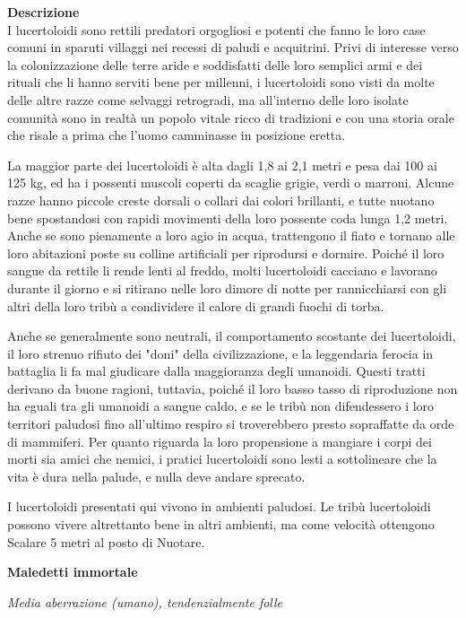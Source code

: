 \begin{multicols}{2}
	\textbf{Descrizione}\\
	I lucertoloidi sono rettili predatori orgogliosi e potenti che fanno le loro case comuni in sparuti villaggi nei recessi di paludi e acquitrini. Privi di interesse verso la colonizzazione delle terre aride e soddisfatti delle loro semplici armi e dei rituali che li hanno serviti bene per millenni, i lucertoloidi sono visti da molte delle altre razze come selvaggi retrogradi, ma all'interno delle loro isolate comunità sono in realtà un popolo vitale ricco di tradizioni e con una storia orale che risale a prima che l'uomo camminasse in posizione eretta.

	La maggior parte dei lucertoloidi è alta dagli 1,8 ai 2,1 metri e pesa dai 100 ai 125 kg, ed ha i possenti muscoli coperti da scaglie grigie, verdi o marroni. Alcune razze hanno piccole creste dorsali o collari dai colori brillanti, e tutte nuotano bene spostandosi con rapidi movimenti della loro possente coda lunga 1,2 metri. Anche se sono pienamente a loro agio in acqua, trattengono il fiato e tornano alle loro abitazioni poste su colline artificiali per riprodursi e dormire. Poiché il loro sangue da rettile li rende lenti al freddo, molti lucertoloidi cacciano e lavorano durante il giorno e si ritirano nelle loro dimore di notte per rannicchiarsi con gli altri della loro tribù a condividere il calore di grandi fuochi di torba.

	Anche se generalmente sono neutrali, il comportamento scostante dei lucertoloidi, il loro strenuo rifiuto dei "doni" della civilizzazione, e la leggendaria ferocia in battaglia li fa mal giudicare dalla maggioranza degli umanoidi. Questi tratti derivano da buone ragioni, tuttavia, poiché il loro basso tasso di riproduzione non ha eguali tra gli umanoidi a sangue caldo, e se le tribù non difendessero i loro territori paludosi fino all'ultimo respiro si troverebbero presto sopraffatte da orde di mammiferi. Per quanto riguarda la loro propensione a mangiare i corpi dei morti sia amici che nemici, i pratici lucertoloidi sono lesti a sottolineare che la vita è dura nella palude, e nulla deve andare sprecato.

	I lucertoloidi presentati qui vivono in ambienti paludosi. Le tribù lucertoloidi possono vivere altrettanto bene in altri ambienti, ma come velocità ottengono Scalare 5 metri al posto di Nuotare.


	\medskip{}\textbf{Maledetti immortale}

	\textit{Media aberrazione (umano), tendenzialmente folle}


\end{multicols}
